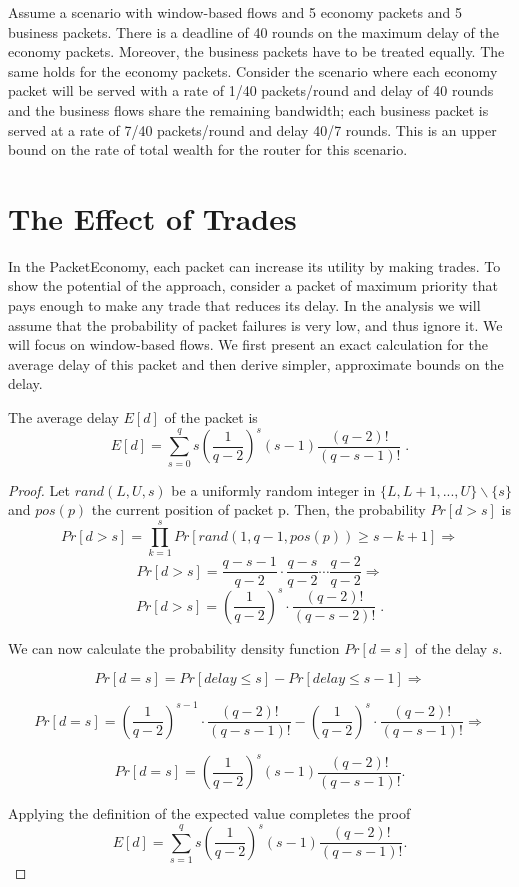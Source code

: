 \documentclass[letterpaper,10pt]{llncs}
\begin{document}
\begin{example}
\label{exa:rates}
Assume a scenario with window-based flows and 5 economy packets and 5 business packets.
There is a deadline of 40 rounds on the maximum delay of the economy packets.
Moreover, the business packets have to be treated equally. The same holds for 
the economy packets. Consider the scenario where each economy packet will be served
with a rate of 1/40 packets/round and delay of 40 rounds and the business flows share 
the remaining bandwidth; each business packet is served at a rate of 7/40 packets/round
and delay 40/7 rounds. This is an upper bound on the rate of total wealth for the router
for this scenario. 
\end{example}

\section{The Effect of Trades}
\label{sec:effect}

In the PacketEconomy, each packet can increase its utility by making trades. 
To show the potential
of the approach, consider a packet of maximum priority that pays enough to 
make any trade that reduces its delay.
In the analysis we will assume that the probability of packet failures is very low, 
and thus ignore it. We will focus on window-based flows.
We first present an exact calculation for the average delay of this packet 
and then derive simpler, approximate bounds on the delay.

\begin{lemma}
\label{lem:delayAVG}
The average delay $E[d]$ of the packet is 
\begin{equation}
E[d] = \sum_{s=0}^q s \left(\frac{1}{q-2}\right)^s (s-1) \frac{(q-2)!}{(q-s-1)!} \; . 
\end{equation}
\end{lemma}

\begin{proof}
Let $rand(L, U, s)$ be a uniformly random integer in $\{L, L+1, ..., U\} \backslash \{s\}$
and $pos(p)$ the current position of packet p. Then, the probability $Pr[d > s]$ is
\[ Pr[d > s] = \prod_{k=1}^s Pr[rand(1,q-1, pos(p)) \geq s-k+1]  \Rightarrow \]
\[ Pr[d > s] = \frac{q-s-1}{q-2} \cdot \frac{q-s}{q-2} \cdots \frac{q-2}{q-2} \Rightarrow \]
\[ Pr[d > s] = \left(\frac{1}{q-2}\right)^{s} \cdot \frac{(q-2)!}{(q-s-2)!} \; . \]

\noindent
We can now calculate the probability density function $Pr[d=s]$ of the delay $s$.

\[ Pr[d = s] = Pr[delay \leq s] - Pr[delay \leq s-1] \Rightarrow \]

\[Pr[d = s] = \left(\frac{1}{q-2}\right)^{s-1} \cdot \frac{(q-2)!}{(q-s-1)!} - \left(\frac{1}{q-2}\right)^s \cdot \frac{(q-2)!}{(q-s-1)!}  \Rightarrow \]

\[Pr[d = s] = \left(\frac{1}{q-2}\right)^s \left(s-1\right) \frac{(q-2)!}{(q-s-1)!} . \] 

\noindent
Applying the definition of the expected value completes the proof
\[E[d] = \sum_{s=1}^{q} s \left(\frac{1}{q-2}\right)^s \left(s-1\right) \frac{(q-2)!}{(q-s-1)!} . \]
\end{proof}
\end{document}
